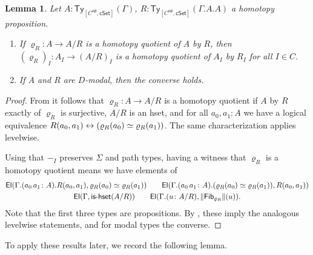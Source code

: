 \documentclass[10pt,a4paper]{article}
\newtheorem{lemma}[theorem]{Lemma}
\theoremstyle{definition}
\theoremstyle{remark}
\newcommand{\cSet}{\mathsf{cSet}}
\DeclareMathOperator\op{\mathsf{op}}
\newcommand\Ty{\mathsf{Ty}}
\newcommand\El{\mathsf{El}}
\DeclarePairedDelimiter\paren{(}{)}
\newcommand\Fib{\mathsf{Fib}}
\begin{document}
\begin{lemma}\label{prop:psh:levelwise-quotient-if-homotopy-quotient}
  Let \(A \colon \Ty_{[C^{\op}, \cSet]}(\Gamma)\), \(R \colon \Ty_{[C^{\op}, \cSet]}(\Gamma.A.A)\) a homotopy proposition.
  \begin{enumerate}[label=(\arabic*)]
    \item If \(\varrho_R \colon A \to A/R\) is a homotopy quotient of \(A\) by \(R\), then \((\varrho_R)_I \colon A_I \to (A/R)_I\) is a homotopy quotient of \(A_I\) by \(R_I\) for all \(I \in C\).
    \item\label{prop:psh:levelwise-quotient-if-homotopy-quotient:modal-converse} If \(A\) and \(R\) are \(D\)-modal, then the converse holds.
  \end{enumerate}
\end{lemma}
\begin{proof}
  From \cite[Theorem 18.2.3]{rijke2025intro} it follows that \(\varrho_R \colon A \to A/R\) is a homotopy quotient if \(A\) by \(R\) exactly of \(\varrho_R\) is surjective, \(A/R\) is an hset, and for all \(a_0, a_1 \colon A\) we have a logical equivalence \(R(a_0, a_1) \leftrightarrow \paren{\varrho_R(a_0) \simeq \varrho_R(a_1)}\).
  The same characterization applies levelwise.

  Using that \(-_I\) preserves \(\Sigma\) and path types, having a witness that \(\varrho_R\) is a homotopy quotient means we have elements of
  \begin{gather*}  
    \El(\Gamma.(a_0\,a_1 \colon A).R(a_0, a_1), \varrho_R(a_0) \simeq \varrho_R(a_1))
    \qquad \El(\Gamma.(a_0\,a_1 \colon A).(\varrho_R(a_0) \simeq \varrho_R(a_1)), R(a_0, a_1)) \\
    \El(\Gamma, \textsf{is-hset}(A/R))
    \qquad
    \El(\Gamma.(u \colon A/R), \trunc{\Fib_{\varrho_R}}(u)).
  \end{gather*}
  Note that the first three types are propositions.
  By , these imply the analogous levelwise statements, and for modal types the converse.
\end{proof}
%
To apply these results later, we record the following lemma.
\end{document}

